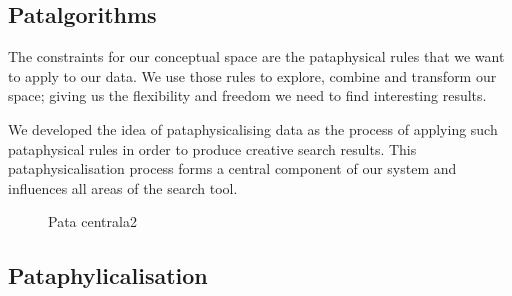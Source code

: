 
\subsection*{Patalgorithms}

\begin{draft}
  The constraints for our conceptual space are the pataphysical rules that we want to apply to our data. We use those rules to explore, combine and transform our space; giving us the flexibility and freedom we need to find interesting results.

  We developed the idea of pataphysicalising data as the process of applying such pataphysical rules in order to produce creative search results. This pataphysicalisation process forms a central component of our system and influences all areas of the search tool.
\end{draft}



\begin{figure}[!htbp] %
  \centering
  
\caption[Pata centrala2]{Pata centrala2}
\label{fig:patasearch02}
\end{figure}


\subsection*{Pataphylicalisation}


